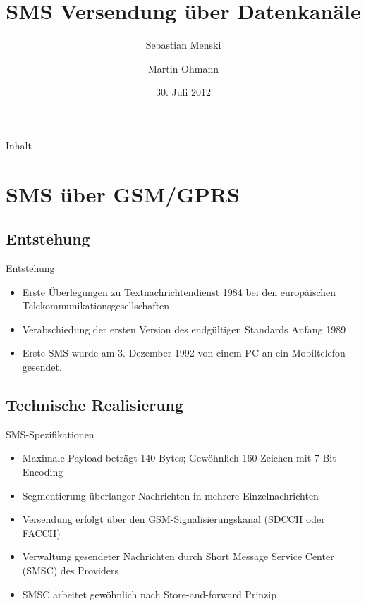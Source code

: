 \documentclass{beamer}
\title[SMS Versendung über Datenkanäle]{SMS Versendung über Datenkanäle}
\author{Sebastian Menski \and Martin Ohmann}
\institute{Institut für Informatik -- Universität Potsdam}
\date{30. Juli 2012}
\begin{document}
\begin{frame}
\titlepage
\end{frame}


\begin{frame}{Inhalt}
\tableofcontents
\end{frame}

\section{SMS über GSM/GPRS}

\subsection{Entstehung}
\begin{frame}{Entstehung}
	\begin{itemize}
		\item Erste Überlegungen zu Textnachrichtendienst 1984 bei den 
			europäischen Telekommunikationsgesellschaften
		\item Verabschiedung der ersten Version des endgültigen Standards 
			Anfang 1989
		\item Erste SMS wurde am 3. Dezember 1992 von einem PC an ein 
			Mobiltelefon gesendet.
	\end{itemize}
\end{frame}

\subsection{Technische Realisierung}
\begin{frame}{SMS-Spezifikationen}
	\begin{itemize}
		\item Maximale Payload beträgt 140 Bytes; Gewöhnlich 160 Zeichen mit 
			7-Bit-Encoding
		\item Segmentierung überlanger Nachrichten in mehrere Einzelnachrichten
		\item Versendung erfolgt über den GSM-Signalisierungskanal (SDCCH oder FACCH)
		\item Verwaltung gesendeter Nachrichten durch Short Message Service 
			Center (SMSC) des Providers
		\item SMSC arbeitet gewöhnlich nach Store-and-forward Prinzip
	\end{itemize}
\end{frame}
\end{document}
